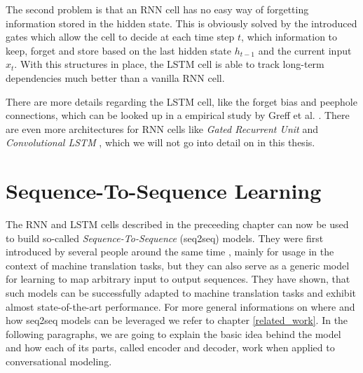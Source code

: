 The second problem is that an RNN cell has no easy way of forgetting information stored in the hidden state. This is obviously solved by the introduced gates which allow the cell to decide at each time step $t$, which information to keep, forget and store based on the last hidden state $h_{t-1}$ and the current input $x_t$. With this structures in place, the LSTM cell is able to track long-term dependencies much better than a vanilla RNN cell.

There are more details regarding the LSTM cell, like the forget bias and peephole connections, which can be looked up in a empirical study by Greff et al. \cite{Greff:2016}. There are even more architectures for RNN cells like \emph{Gated Recurrent Unit} \cite{Chung:2014} and \emph{Convolutional LSTM} \cite{Xingjian:2015}, which we will not go into detail on in this thesis.

\section{Sequence-To-Sequence Learning}
\label{fundamentals:seq2seq}
The RNN and LSTM cells described in the preceeding chapter can now be used to build so-called \emph{Sequence-To-Sequence} (seq2seq) models. They were first introduced by several people around the same time \cite{Sutskever:2014}\cite{Kalchbrenner:2013}\cite{Cho:2014}, mainly for usage in the context of machine translation tasks, but they can also serve as a generic model for learning to map arbitrary input to output sequences. They have shown, that such models can be successfully adapted to machine translation tasks and exhibit almost state-of-the-art performance. For more general informations on where and how seq2seq models can be leveraged we refer to chapter \ref{related_work}. In the following paragraphs, we are going to explain the basic idea behind the model and how each of its parts, called encoder and decoder, work when applied to conversational modeling.

